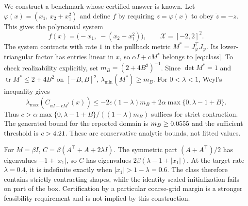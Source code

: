 \documentclass[12pt,onecolumn,journal]{IEEEtran}
\newcommand{\X}{\mathcal{X}}
\newcommand{\lmax}{\lambda_{\max}}
\providecommand{\tr}{}
\renewcommand{\tr}{\operatorname{tr}}
\begin{document}
We construct a benchmark whose certified answer is known. Let $\varphi(x) = (x_1,\, x_2 + x_1^2)$ and define $f$ by requiring $z = \varphi(x)$ to obey $\dot z = -z$. This gives the polynomial system
\begin{equation}
f(x) = \big( -x_1,\; -(x_2 - x_1^2) \big), \qquad \X = [-2, 2]^2 .
\label{eq:bench}
\end{equation}
The system contracts with rate $1$ in the pullback metric $M^*=J_\varphi^\top J_\varphi$. Its lower-triangular factor has entries linear in $x$, so $\alpha I+cM^*$ belongs to \eqref{eq:class}. To check realizability explicitly, set $m_B=(2+4B^2)^{-1}$. Since $\det M^*=1$ and $\tr M^*\le2+4B^2$ on $[-B,B]^2$, $\lambda_{\min}(M^*)\ge m_B$. For $0<\lambda<1$, Weyl's inequality gives
\[
\lmax\!\left(C_{\alpha I+cM^*}(x)\right)
\le -2c(1-\lambda)m_B+2\alpha\max\{0,\lambda-1+B\}.
\]
Thus $c>\alpha\max\{0,\lambda-1+B\}/((1-\lambda)m_B)$ suffices for strict contraction. The generated bound for the reported domain is $m_B\ge0.0555$ and the sufficient threshold is $c>4.21$. These are conservative analytic bounds, not fitted values.

For $M=\beta I$, $C=\beta(A^\top+A+2\lambda I)$. The symmetric part $(A+A^\top)/2$ has eigenvalues $-1\pm|x_1|$, so $C$ has eigenvalues $2\beta(\lambda-1\pm|x_1|)$. At the target rate $\lambda=0.4$, it is indefinite exactly when $|x_1|>1-\lambda=0.6$. The class therefore contains strictly contracting shapes, while the identity-scaled initialization fails on part of the box. Certification by a particular coarse-grid margin is a stronger feasibility requirement and is not implied by this construction.
\end{document}
